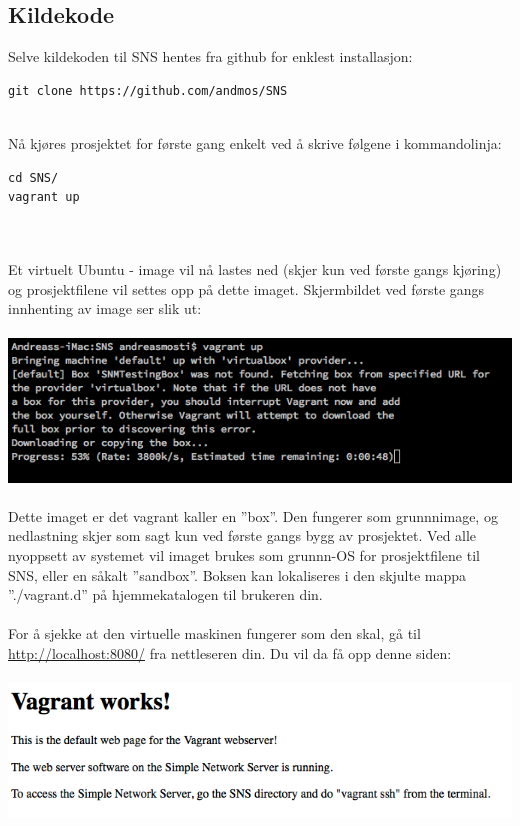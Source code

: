 \documentclass{article}
\begin{document}
\subsection{Kildekode}
Selve kildekoden til SNS hentes fra github for enklest installasjon: 

\begin{lstlisting}
git clone https://github.com/andmos/SNS
\end{lstlisting}
\\
Nå kjøres prosjektet for første gang enkelt ved å skrive følgene i kommandolinja: 
\begin{lstlisting}
cd SNS/
vagrant up
\end{lstlisting}
\\ \\
Et virtuelt Ubuntu - image vil nå lastes ned (skjer kun ved første gangs kjøring) og prosjektfilene vil settes opp på dette imaget. 
Skjermbildet ved første gangs innhenting av image ser slik ut: \\ \\
\includegraphics[scale = 0.7]{pictures/vagrantFirstTime.png}
\\ \\
Dette imaget er det vagrant kaller en ''box''. Den fungerer som grunnnimage, og nedlastning skjer som sagt kun ved første gangs bygg av prosjektet. Ved alle nyoppsett av systemet vil imaget brukes som grunnn-OS for prosjektfilene til SNS, eller en såkalt ''sandbox''. Boksen kan lokaliseres i den skjulte mappa ''./vagrant.d'' på hjemmekatalogen til brukeren din. \\ \\
For å sjekke at den virtuelle maskinen fungerer som den skal, gå til \url{http://localhost:8080/} fra nettleseren din. Du vil da få opp denne siden:
\\ \\
\includegraphics[scale = 0.7]{pictures/vagrantWorks.png} 
\\ \\
\end{document}
